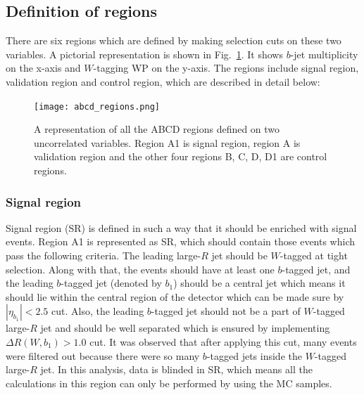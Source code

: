 \subsection{Definition of regions}
\label{sec:abcd:implementation:regions}
There are six regions which are defined by making selection cuts on these two variables. A pictorial representation is shown in Fig.\ \ref{fig:abcd:method:regions}. It shows $b$-jet multiplicity on the x-axis and $W$-tagging WP on the y-axis. The regions include signal region, validation region and control region, which are described in detail below:

\begin{figure}[hbt!]
	\centering
	\texttt{[image: abcd\_regions.png]}
	\caption{A representation of all the ABCD regions defined on two uncorrelated variables. Region A1 is signal region, region A is validation region and the other four regions B, C, D, D1 are control regions.}
	\label{fig:abcd:method:regions}
\end{figure}

\subsubsection{Signal region}
\label{sec:abcd:implementation:regions:sr}
Signal region (SR) is defined in such a way that it should be enriched with signal events. Region A1 is represented as SR, which should contain those events which pass the following criteria. The leading large-$R$ jet should be $W$-tagged at tight selection. Along with that, the events should have at least one $b$-tagged jet, and the leading $b$-tagged jet (denoted by $b_{\text{1}}$) should be a central jet which means it should lie within the central region of the detector which can be made sure by $|\eta_{b_{1}}| < 2.5$ cut. Also, the leading $b$-tagged jet should not be a part of $W$-tagged large-$R$ jet and should be well separated which is ensured by implementing $\Delta R(W,b_{\text{1}}) > 1.0$ cut. It was observed that after applying this cut, many events were filtered out because there were so many $b$-tagged jets inside the $W$-tagged large-$R$ jet. In this analysis, data is blinded in SR, which means all the calculations in this region can only be performed by using the MC samples.

